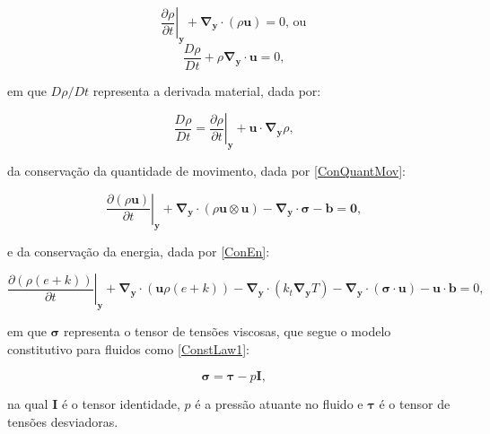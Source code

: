 \documentclass[_ArquivoPrincipal.tex]{subfiles}
\begin{document}
\begin{equation}
    \left.\frac{\partial\rho}{\partial t}\right|_{\mathbf{y}}+\mathbf{\nabla}_\mathbf{y}\cdot(\rho\mathbf{u})=0\text{, ou}
    \label{ConMas1}
\end{equation}
\begin{equation}
    \frac{D\rho}{Dt}+\rho\mathbf{\nabla}_\mathbf{y}\cdot\mathbf{u}=0\text{,}
    \label{ConMas2}
\end{equation}

\noindent em que $D\rho/Dt$ representa a derivada material, dada por:

\begin{equation}
    \frac{D\rho}{Dt}=\left.\frac{\partial\rho}{\partial t}\right|_\mathbf{y}+\mathbf{u}\cdot\mathbf{\nabla}_\mathbf{y}\rho\text{,}
    \label{DerMat}
\end{equation}

\noindent da conservação da quantidade de movimento, dada por \ref{ConQuantMov}:

\begin{equation}
    \left.\frac{\partial(\rho\mathbf{u})}{\partial t}\right|_\mathbf{y}+\mathbf{\nabla}_\mathbf{y}\cdot(\rho\mathbf{u}\otimes\mathbf{u})-\mathbf{\nabla}_\mathbf{y}\cdot\mathbf{\sigma}-\mathbf{b}=\mathbf{0}\text{,}
    \label{ConQuantMov}
\end{equation}

\noindent e da conservação da energia, dada por \ref{ConEn}:

\begin{equation}
    \left.\frac{\partial(\rho(e+k))}{\partial t}\right|_\mathbf{y}+\mathbf{\nabla}_\mathbf{y}\cdot(\mathbf{u}\rho(e+k))-\mathbf{\nabla}_\mathbf{y}\cdot(k_t\mathbf{\nabla}_\mathbf{y}T)-\mathbf{\nabla}_\mathbf{y}\cdot(\mathbf{\sigma\cdot\mathbf{u}})-\mathbf{u}\cdot\mathbf{b}=0\text{,}
    \label{ConEn}
\end{equation}

\noindent em que $\mathbf{\sigma}$ representa o tensor de tensões viscosas, que segue o modelo constitutivo para fluidos como \ref{ConstLaw1}:

\begin{equation}
    \mathbf{\sigma}=\mathbf{\tau}-p\mathbf{I}\text{,}
    \label{ConstLaw1}
\end{equation}

\noindent na qual $\mathbf{I}$ é o tensor identidade, $p$ é a pressão atuante no fluido e $\mathbf{\tau}$ é o tensor de tensões desviadoras.

\end{document}
